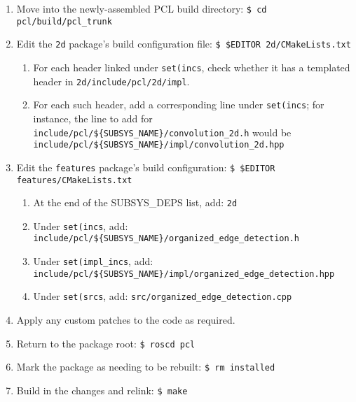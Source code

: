 \documentclass[12pt]{report}
\begin{document}
\begin{enumerate}
\item{Move into the newly-assembled PCL build directory: \texttt{\$\ cd pcl/build/pcl\_trunk}}
\item{Edit the \texttt{2d} package's build configuration file: \texttt{\$\ \$EDITOR 2d/CMakeLists.txt}}
\begin{enumerate}
\item{For each header linked under \texttt{set(incs}, check whether it has a templated header in \texttt{2d/include/pcl/2d/impl}.}
\item{For each such header, add a corresponding line under \texttt{set(incs}; for instance, the line to add for \texttt{include/pcl/\$\{SUBSYS\_NAME\}/convolution\_2d.h} would be \texttt{include/pcl/\$\{SUBSYS\_NAME\}/impl/convolution\_2d.hpp}}
\end{enumerate}
\item{Edit the \texttt{features} package's build configuration: \texttt{\$\ \$EDITOR features/CMakeLists.txt}}
\begin{enumerate}
\item{At the end of the SUBSYS\_DEPS list, add: \texttt{2d}}
\item{Under \texttt{set(incs}, add: \texttt{include/pcl/\$\{SUBSYS\_NAME\}/organized\_edge\_detection.h}}
\item{Under \texttt{set(impl\_incs}, add: \texttt{include/pcl/\$\{SUBSYS\_NAME\}/impl/organized\_edge\_detection.hpp}}
\item{Under \texttt{set(srcs}, add: \texttt{src/organized\_edge\_detection.cpp}}
\end{enumerate}
\item{Apply any custom patches to the code as required.}
\item{Return to the package root: \texttt{\$\ roscd pcl}}
\item{Mark the package as needing to be rebuilt: \texttt{\$\ rm installed}}
\item{Build in the changes and relink: \texttt{\$\ make}}
\end{enumerate}
\end{document}
